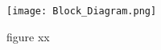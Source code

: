 \documentclass[lettersize,oneside,11pt]{book}
\begin{document}
\blindtext
\blindtext
\blindtext

\begin{figure} [htbp]
\texttt{[image: Block\_Diagram.png]}
\caption{figure xx}
\label{fig:figure xx}
\end{figure}
\end{document}

